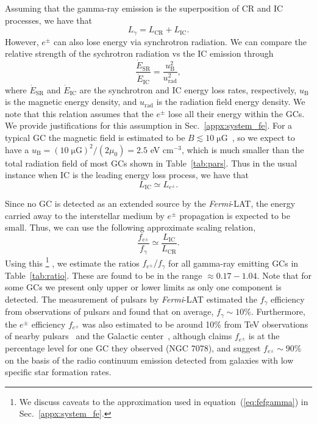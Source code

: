 \documentclass[doublespace,nopageskip]{VTthesis} %
\begin{document}
Assuming that the gamma-ray emission is the superposition of CR and IC processes, we have that
\begin{equation}
    L_\gamma = L_\mathrm{CR} + L_\mathrm{IC}.
\end{equation}
However, $e^\pm$ can also lose energy via synchrotron radiation. We can compare the relative strength of the sychrotron radiation vs the IC emission through
\begin{equation}
    \frac{\dot{E}_\mathrm{SR}}{\dot{E}_\mathrm{IC}} = \frac{u_\mathrm{B}^2}{u_\mathrm{rad}^2},
\end{equation}
where $\dot{E}_\mathrm{SR}$ and $\dot{E}_\mathrm{IC}$ are the synchrotron and IC energy loss rates, respectively, $u_\mathrm{B}$ is the magnetic energy density, and $u_\mathrm{rad}$ is the radiation field energy density. We note that this relation assumes that the $e^\pm$ lose all their energy within the GCs. We provide justifications for this assumption in Sec.~\ref{appx:system_fe}. For a typical GC the magnetic field is estimated to be $B\lesssim \mathrm{10\;\mu G}$~\citep{2007MNRAS.377..920B}, so we expect to have a $u_\mathrm{B} = {\mathrm{(10\;\mu G)}^2}/{(2\mu_0)} = 2.5$ eV cm$^{-3}$, which is much smaller than the total radiation field of most GCs shown in Table~\ref{tab:pars}. Thus in the usual instance when IC is the leading energy loss process, we have that
\begin{equation}
    L_\mathrm{IC} \simeq L_{e^\pm}.
\end{equation}

Since no GC is detected as an extended source by the \textit{Fermi}-LAT, the energy carried away to the interstellar medium by $e^\pm$ propagation is expected to be small. Thus, we can use the following approximate scaling relation,
\begin{equation}\label{eq:fefgamma}
    \dfrac{f_{e^\pm}}{f_\gamma} \simeq \dfrac{L_\mathrm{IC}}{L_\mathrm{CR}}.
\end{equation}
Using this
\footnote{We discuss caveats to the approximation used in equation~(\ref{eq:fefgamma}) in Sec.~\ref{appx:system_fe}.}
, we estimate the ratios $f_{e^\pm}/f_\gamma$ for all gamma-ray emitting GCs in Table~\ref{tab:ratio}. These are found to be in the range $\approx 0.17 - 1.04$. Note that for some GCs we present only upper or lower limits as only one component is detected. The measurement of pulsars by \textit{Fermi}-LAT estimated the $f_{\gamma}$ efficiency from observations of pulsars and found that on average, $f_\gamma \sim \mathrm{10\%}$. Furthermore, the $e^\pm$ efficiency $f_{e^\pm}$ was also estimated to be around 10\% from TeV observations of {nearby pulsars~\citep{2017PhRvD..96j3013H, 2018PhRvD..98d3005H, 2021arXiv210400014H} and} the Galactic center~\citep{2013MNRAS.435L..14B}, although \citet{2019MNRAS.484.2876M} claims $f_{e^\pm}$ is at the percentage level for one GC they observed (NGC 7078), and \citet{2020arXiv200508982S} suggest $f_{e^\pm} \sim 90\%$ on the basis of the  radio continuum emission detected from galaxies with low specific star formation rates.
\end{document}
